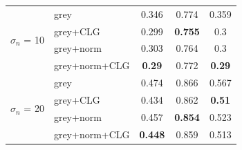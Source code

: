 \begin{table}[ht]
\begin{tabular}{crcrr}
          \midrule
          
    \multicolumn{1}{r}{\multirow{4}[0]{*}{$\sigma_n$ = 10}} & \multicolumn{1}{l}{grey} & 0.346 & \multicolumn{1}{c}{0.774} & \multicolumn{1}{c}{0.359} \\
          & \multicolumn{1}{l}{grey+CLG} & 0.299 & \multicolumn{1}{c}{\textbf{0.755}} & \multicolumn{1}{c}{0.3} \\
          & \multicolumn{1}{l}{grey+norm} & 0.303 & \multicolumn{1}{c}{0.764} & \multicolumn{1}{c}{0.3} \\
          & \multicolumn{1}{l}{grey+norm+CLG} & \textbf{0.29} & \multicolumn{1}{c}{0.772} & \multicolumn{1}{c}{\textbf{0.29}} \\
          
          \midrule
          
    \multicolumn{1}{r}{\multirow{4}[0]{*}{$\sigma_n$ = 20}} & \multicolumn{1}{l}{grey} & 0.474 & \multicolumn{1}{c}{0.866} & \multicolumn{1}{c}{0.567} \\
          & \multicolumn{1}{l}{grey+CLG} & 0.434 & \multicolumn{1}{c}{0.862} & \multicolumn{1}{c}{\textbf{0.51}} \\
          & \multicolumn{1}{l}{grey+norm} & 0.457 & \multicolumn{1}{c}{\textbf{0.854}} & \multicolumn{1}{c}{0.523} \\
          & \multicolumn{1}{l}{grey+norm+CLG} & \textbf{0.448} & \multicolumn{1}{c}{0.859} & \multicolumn{1}{c}{0.513} \\
    \bottomrule
    \end{tabular}%
  \label{tab:exp_norm}%
\end{table}%

